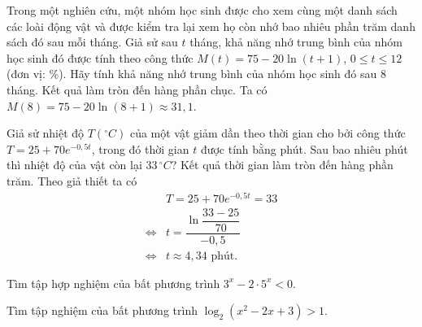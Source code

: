 \begin{ex}%
	Trong một nghiên cứu, một nhóm học sinh được cho xem cùng một danh sách các loài động vật và được kiểm tra lại xem họ còn nhớ bao nhiêu phần trăm danh sách đó sau mỗi tháng. Giả sử sau $t$ tháng, khả năng nhớ trung bình của nhóm học sinh đó được tính theo công thức $M(t) = 75 - 20\ln(t+1)$, $0 \le t \le 12$ (đơn vị: \%). Hãy tính khả năng nhớ trung bình của nhóm học sinh đó sau $8$ tháng. Kết quả làm tròn đến hàng phần chục.
	\loigiai
	{
		Ta có $M(8) = 75 - 20\ln(8+1) \approx 31{,}1$.
	}
\end{ex}

\begin{ex}%
	Giả sử nhiệt độ $T({}^\circ C)$ của một vật giảm dần theo thời gian cho bởi công thức $T = 25 + 70e^{-0{,}5t}$, trong đó thời gian $t$ được tính bằng phút. Sau bao nhiêu phút thì nhiệt độ của vật còn lại $33\, {}^\circ C$? Kết quả thời gian làm tròn đến hàng phần trăm.
\loigiai
	{
		Theo giả thiết ta có
		\begin{align*}
			&T = 25 + 70e^{-0{,}5t} = 33\\
			\Leftrightarrow &t = \dfrac{\ln\dfrac{33-25}{70}}{-0{,}5}\\
			\Leftrightarrow &t \approx 4{,}34 \text{ phút}.
		\end{align*}
	}
\end{ex}

\begin{bt}%
	Tìm tập hợp nghiệm của bất phương trình $3^x-2\cdot5^x<0$.
\end{bt}

\begin{ex}%
	Tìm tập nghiệm của bất phương trình $\log_2\left(x^2-2x+3\right)>1$.
\end{ex}

